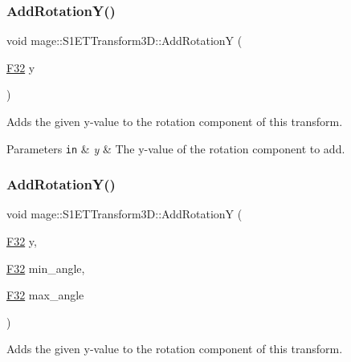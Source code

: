 \subsubsection{\texorpdfstring{Add\+Rotation\+Y()}{AddRotationY()}\hspace{0.1cm}{\footnotesize\ttfamily [1/2]}}
{\footnotesize\ttfamily void mage\+::\+S1\+E\+T\+Transform3\+D\+::\+Add\+RotationY (\begin{DoxyParamCaption}\item[{\mbox{\hyperlink{namespacemage_aa97e833b45f06d60a0a9c4fc22ae02c0}{F32}}}]{y }\end{DoxyParamCaption})\hspace{0.3cm}{\ttfamily [noexcept]}}

Adds the given y-\/value to the rotation component of this transform.


\begin{DoxyParams}[1]{Parameters}
\mbox{\tt in}  & {\em y} & The y-\/value of the rotation component to add. \\
\hline
\end{DoxyParams}
\mbox{\label{classmage_1_1_s1_e_t_transform3_d_a10d648137ed487f9051430845687cd1c}} 
\subsubsection{\texorpdfstring{Add\+Rotation\+Y()}{AddRotationY()}\hspace{0.1cm}{\footnotesize\ttfamily [2/2]}}
{\footnotesize\ttfamily void mage\+::\+S1\+E\+T\+Transform3\+D\+::\+Add\+RotationY (\begin{DoxyParamCaption}\item[{\mbox{\hyperlink{namespacemage_aa97e833b45f06d60a0a9c4fc22ae02c0}{F32}}}]{y,  }\item[{\mbox{\hyperlink{namespacemage_aa97e833b45f06d60a0a9c4fc22ae02c0}{F32}}}]{min\+\_\+angle,  }\item[{\mbox{\hyperlink{namespacemage_aa97e833b45f06d60a0a9c4fc22ae02c0}{F32}}}]{max\+\_\+angle }\end{DoxyParamCaption})\hspace{0.3cm}{\ttfamily [noexcept]}}

Adds the given y-\/value to the rotation component of this transform.

